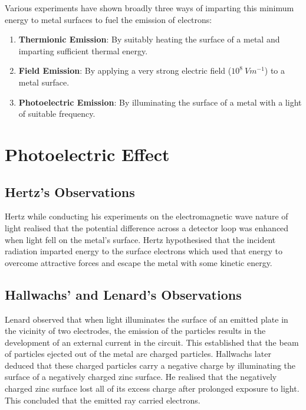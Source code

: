 \documentclass{article}
\begin{document}
Various experiments have shown broadly three ways of imparting this minimum energy to metal surfaces to fuel the emission of electrons: 
\begin{enumerate}
    \item \textbf{Thermionic Emission}: By suitably heating the surface of a metal and imparting sufficient thermal energy. 
    \item \textbf{Field Emission}: By applying a very strong electric field ($10^{8} \ V m^{-1}$) to a metal surface.
    \item \textbf{Photoelectric Emission}: By illuminating the surface of a metal with a light of suitable frequency.
\end{enumerate}
\section{Photoelectric Effect}
\subsection{Hertz's Observations}
Hertz while conducting his experiments on the electromagnetic wave nature of light realised that the potential difference across a detector loop was enhanced when light fell on the metal's surface. Hertz hypothesised that the incident radiation imparted energy to the surface electrons which used that energy to overcome attractive forces and escape the metal with some kinetic energy. 

\subsection{Hallwachs' and Lenard's Observations}
 Lenard observed that when light illuminates the surface of an emitted plate in the vicinity of two electrodes, the emission of the particles results in the development of an external current in the circuit. This established that the beam of particles ejected out of the metal are charged particles.  
 Hallwachs later deduced that these charged particles carry a negative charge by illuminating the surface of a negatively charged zinc surface. He realised that the negatively charged zinc surface lost all of its excess charge after prolonged exposure to light. This concluded that the emitted ray carried electrons. 
\end{document}
